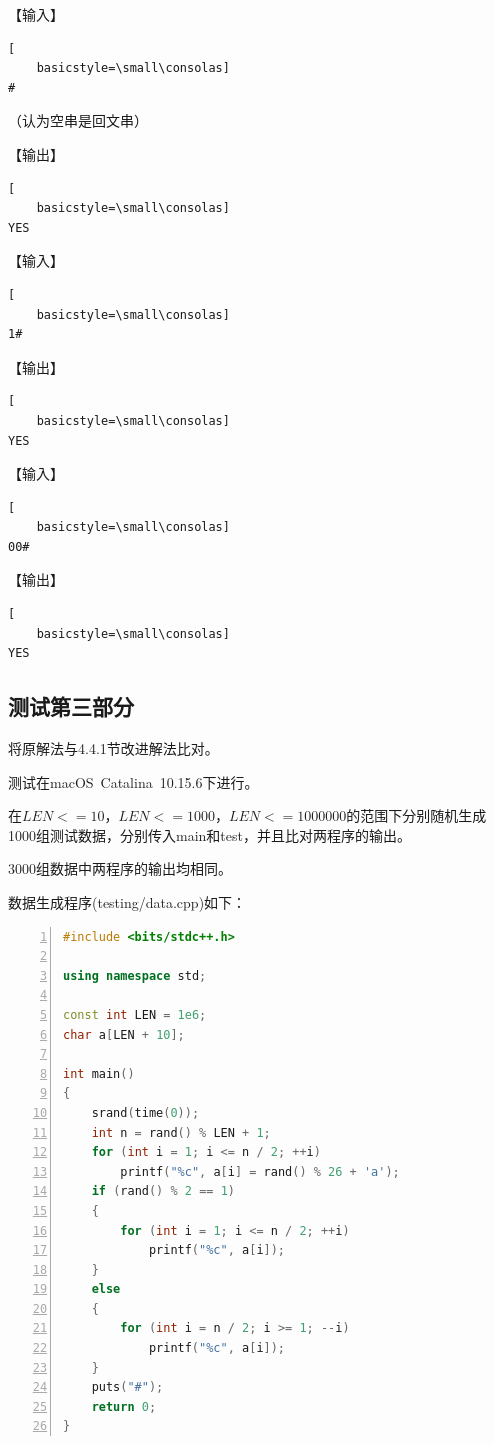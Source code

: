 \documentclass{article}
\begin{document}
【输入】

\begin{lstlisting}[
    basicstyle=\small\consolas]
#
\end{lstlisting}

（认为空串是回文串）

【输出】

\begin{lstlisting}[
    basicstyle=\small\consolas]
YES
\end{lstlisting}

【输入】

\begin{lstlisting}[
    basicstyle=\small\consolas]
1#
\end{lstlisting}

【输出】

\begin{lstlisting}[
    basicstyle=\small\consolas]
YES
\end{lstlisting}

【输入】

\begin{lstlisting}[
    basicstyle=\small\consolas]
00#
\end{lstlisting}

【输出】

\begin{lstlisting}[
    basicstyle=\small\consolas]
YES
\end{lstlisting}

\subsection{测试第三部分}

将原解法与4.4.1节改进解法比对。

测试在macOS\ Catalina\ 10.15.6下进行。

在$LEN<=10$，$LEN<=1000$，$LEN<=1000000$的范围下分别随机生成1000组测试数据，分别传入main和test，并且比对两程序的输出。

3000组数据中两程序的输出均相同。

数据生成程序(testing/data.cpp)如下：

\begin{lstlisting}[language={C++},
    numbers=left,
    numberstyle=\tiny\consolas,
    basicstyle=\small\consolas]
#include <bits/stdc++.h>

using namespace std;

const int LEN = 1e6;
char a[LEN + 10];

int main()
{
    srand(time(0));
    int n = rand() % LEN + 1;
    for (int i = 1; i <= n / 2; ++i)
        printf("%c", a[i] = rand() % 26 + 'a');
    if (rand() % 2 == 1)
    {
        for (int i = 1; i <= n / 2; ++i)
            printf("%c", a[i]);
    }
    else
    {
        for (int i = n / 2; i >= 1; --i)
            printf("%c", a[i]);
    }
    puts("#");
    return 0;
}
\end{lstlisting}
\end{document}

